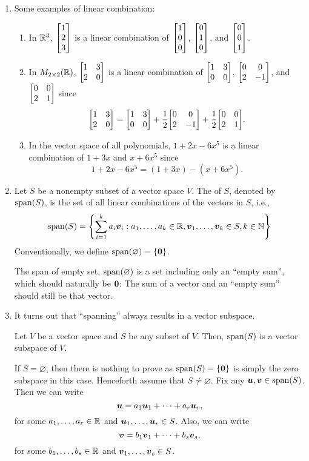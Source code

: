 \begin{enumerate}
\item Some examples of linear combination:
\begin{enumerate}
\item In \(\mathbb{R}^3\), \(\mqty[1\\2\\3]\) is a linear combination of
\(\mqty[1\\0\\0]\), \(\mqty[0\\1\\0]\), and \(\mqty[0\\0\\1]\).
\item In \(M_{2\times 2}(\mathbb{R})\), \(\mqty[1&3\\ 2&0]\) is a linear combination of
\(\mqty[1&3\\ 0&0]\), \(\mqty[0&0\\ 2&-1]\), and \(\mqty[0&0\\ 2&1]\) since
\[
\mqty[1&3\\ 2&0]=\mqty[1&3\\ 0&0]+\frac{1}{2}\mqty[0&0\\ 2&-1]+\frac{1}{2}\mqty[0&0\\ 2&1].
\]
\item In the vector space of all polynomials, \(1+2x-6x^5\) is a linear
combination of \(1+3x\) and \(x+6x^5\) since
\[
1+2x-6x^5=(1+3x)-(x+6x^5).
\]
\end{enumerate}
\item Let \(S\) be a nonempty subset of a vector space \(V\). The 
of \(S\), denoted by \(\operatorname{span}(S)\), is the set of all linear
combinations of the vectors in \(S\), i.e.,
\[
\operatorname{span}(S)=\qty{\sum_{i=1}^{k}a_i\vb*{v}_i:a_1,\dotsc,a_k\in\mathbb{R}, \vb*{v}_1,\dotsc,\vb*{v}_k\in S, k\in\mathbb{N}}
\]
Conventionally, we define \(\operatorname{span}(\varnothing)=\{\vb*{0}\}\). \begin{intuition}
The span of empty set, \(\operatorname{span}(\varnothing)\) is a set including only an ``empty
sum'', which should naturally be \(\vb*{0}\): The sum of a vector and an
``empty sum'' should still be that vector.
\end{intuition}

\item It turns out that ``spanning'' always results in a vector subspace.
\begin{proposition}
\label{prp:span-vec-subsp}
Let \(V\) be a vector space and \(S\) be any subset of \(V\). Then, \(\operatorname{span}(S)\)
is a vector subspace of \(V\).
\end{proposition}
\begin{pf}
If \(S=\varnothing\), then there is nothing to prove as
\(\operatorname{span}(S)=\{\vb*{0}\}\) is simply the zero subspace in this case.
Henceforth assume that \(S\ne\varnothing\). Fix any
\(\vb*{u},\vb*{v}\in\operatorname{span}(S)\). Then we can write
\[
\vb*{u}=a_1\vb*{u}_1+\dotsb+a_r\vb*{u}_r,
\]
for some \(a_1,\dotsc,a_r\in\mathbb{R}\) and \(\vb*{u}_1,\dotsc,\vb*{u}_r\in S\).
Also, we can write
\[
\vb*{v}=b_1\vb*{v}_1+\dotsb+b_s\vb*{v}_s,
\]
for some \(b_1,\dotsc,b_s\in\mathbb{R}\) and \(\vb*{v}_1,\dotsc,\vb*{v}_s\in S\).


\end{pf}
\end{enumerate}
